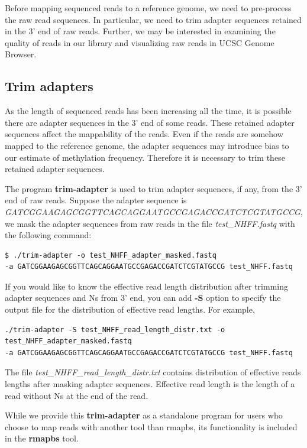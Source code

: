 \documentclass{article}
\begin{document}
Before mapping sequenced reads to a reference genome, we need to
pre-process the raw read sequences. In particular, we need to trim
adapter sequences retained in the 3' end of raw
reads. Further, we may be interested in examining the quality of reads
in our library and visualizing raw reads in UCSC Genome Browser. 

\subsection{Trim adapters}
\label{sec:trim-adapter}
As the length of sequenced reads
has been increasing all the time, it is possible there are adapter
sequences in the 3' end of some reads. These retained adapter
sequences affect the mappability of the reads. Even if the reads are
somehow mapped to the reference genome, the adapter sequences may
introduce bias to our estimate of methylation frequency. Therefore it
is necessary to trim these retained adapter sequences. 

The program \textbf{trim-adapter} is used to trim adapter sequences,
if any, from the 3' end of raw reads. Suppose the adapter sequence is
\textit{GATCGGAAGAGCGGTTCAGCAGGAATGCCGAGACCGATCTCGTATGCCG}, we mask
the adapter sequences from raw reads in the file
 \textit{test\_NHFF.fastq} with the
following command:
\begin{verbatim}
$ ./trim-adapter -o test_NHFF_adapter_masked.fastq   
-a GATCGGAAGAGCGGTTCAGCAGGAATGCCGAGACCGATCTCGTATGCCG test_NHFF.fastq  
\end{verbatim}

If you would like to know the effective read length distribution after trimming
adapter sequences and Ns from 3' end, you can add \textbf{-S} option
to specify the output file for the distribution of effective read lengths. For example,
\begin{verbatim}
./trim-adapter -S test_NHFF_read_length_distr.txt -o test_NHFF_adapter_masked.fastq
-a GATCGGAAGAGCGGTTCAGCAGGAATGCCGAGACCGATCTCGTATGCCG test_NHFF.fastq
\end{verbatim}
The file \textit{test\_NHFF\_read\_length\_distr.txt} contains distribution of effective reads
lengths after masking adapter sequences. Effective read length is the length of a read 
 without Ns at the end of the read.

While we provide this \textbf{trim-adapter} as a standalone program
for users who choose to map reads with another tool than rmapbs, its functionality is included
in the \textbf{rmapbs} tool.
\end{document}
